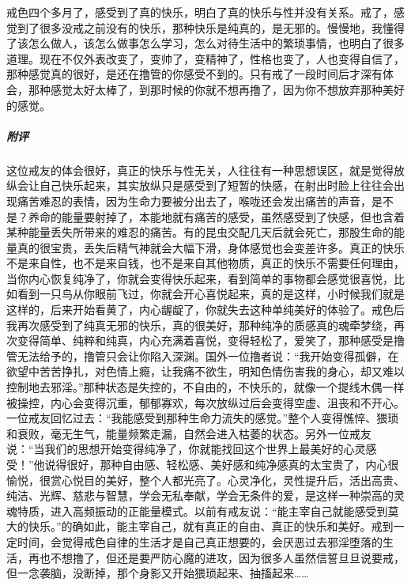 \begin{case}
    戒色四个多月了，感受到了真的快乐，明白了真的快乐与性并没有关系。戒了，感觉到了很多没戒之前没有的快乐，那种快乐是纯真的，是无邪的。慢慢地，我懂得了该怎么做人，该怎么做事怎么学习，怎么对待生活中的繁琐事情，也明白了很多道理。现在不仅外表改变了，变帅了，变精神了，性格也变了，人也变得自信了，那种感觉真的很好，是还在撸管的你感受不到的。只有戒了一段时间后才深有体会，那种感觉太好太棒了，到那时候的你就不想再撸了，因为你不想放弃那种美好的感觉。
    \subparagraph{附评} 这位戒友的体会很好，真正的快乐与性无关，人往往有一种思想误区，就是觉得放纵会让自己快乐起来，其实放纵只是感受到了短暂的快感，在射出时脸上往往会出现痛苦难忍的表情，因为生命力要被分出去了，喉咙还会发出痛苦的声音，是不是？养命的能量要射掉了，本能地就有痛苦的感受，虽然感受到了快感，但也含着某种能量丢失所带来的难忍的痛苦。有的昆虫交配几天后就会死亡，那股生命的能量真的很宝贵，丢失后精气神就会大幅下滑，身体感觉也会变差许多。真正的快乐不是来自性，也不是来自钱，也不是来自其他物质，真正的快乐不需要任何理由，当你内心恢复纯净了，你就会变得快乐起来，看到简单的事物都会感觉很喜悦，比如看到一只鸟从你眼前飞过，你就会开心喜悦起来，真的是这样，小时候我们就是这样的，后来开始看黄了，内心龌龊了，你就失去这种单纯美好的体验了。戒色后我再次感受到了纯真无邪的快乐，真的很美好，那种纯净的质感真的魂牵梦绕，再次变得简单、纯粹和纯真，内心充满着喜悦，变得轻松了，爱笑了，那种感受是撸管无法给予的，撸管只会让你陷入深渊。国外一位撸者说：“我开始变得孤僻，在欲望中苦苦挣扎，对色情上瘾，让我痛不欲生，明知色情伤害我的身心，却又难以控制地去邪淫。”那种状态是失控的，不自由的，不快乐的，就像一个提线木偶一样被操控，内心会变得沉重，郁郁寡欢，每次放纵过后会变得空虚、沮丧和不开心。一位戒友回忆过去：“我能感受到那种生命力流失的感觉。”整个人变得憔悴、猥琐和衰败，毫无生气，能量频繁走漏，自然会进入枯萎的状态。另外一位戒友说：“当我们的思想开始变得纯净了，你就能找回这个世界上最美好的心灵感受！”他说得很好，那种自由感、轻松感、美好感和纯净感真的太宝贵了，内心很愉悦，很赏心悦目的美好，整个人都光亮了。心灵净化，灵性提升后，活出高贵、纯洁、光辉、慈悲与智慧，学会无私奉献，学会无条件的爱，是这样一种崇高的灵魂特质，进入高频振动的正能量模式。以前有戒友说：“能主宰自己就能感受到莫大的快乐。”的确如此，能主宰自己，就有真正的自由、真正的快乐和美好。戒到一定时间，会觉得戒色自律的生活才是自己真正想要的，会厌恶过去邪淫堕落的生活，再也不想撸了，但还是要严防心魔的进攻，因为很多人虽然信誓旦旦说要戒，但一念袭脑，没断掉，那个身影又开始猥琐起来、抽搐起来……
\end{case}

